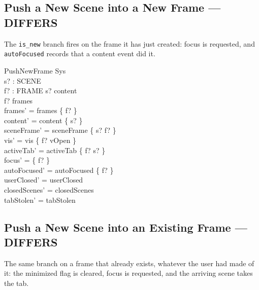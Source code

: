 \documentclass[a4paper,10pt,fleqn]{article}
\begin{document}
\subsection{Push a New Scene into a New Frame --- DIFFERS}

The \texttt{is\_new} branch fires on the frame it has just created: focus is
requested, and \texttt{autoFocused} records that a content event did it.

\begin{schema}{PushNewFrame}
  \Delta Sys \\
  s? : SCENE \\
  f? : FRAME
\where
  s? \notin content \\
  f? \notin frames \\
  frames' = frames \cup \{ f? \} \\
  content' = content \cup \{ s? \} \\
  sceneFrame' = sceneFrame \cup \{ s? \mapsto f? \} \\
  vis' = vis \cup \{ f? \mapsto vOpen \} \\
  activeTab' = activeTab \cup \{ f? \mapsto s? \} \\
  focus' = \{ f? \} \\
  autoFocused' = autoFocused \cup \{ f? \} \\
  userClosed' = userClosed \\
  closedScenes' = closedScenes \\
  tabStolen' = tabStolen
\end{schema}

\subsection{Push a New Scene into an Existing Frame --- DIFFERS}

The same branch on a frame that already exists, whatever the user had made of
it: the minimized flag is cleared, focus is requested, and the arriving scene
takes the tab.
\end{document}
